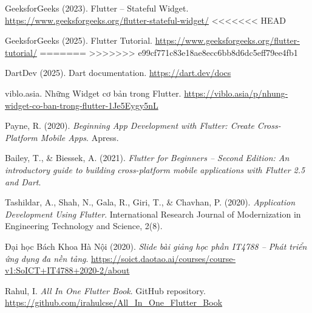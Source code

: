 \hypersetup{
  colorlinks=true,
  urlcolor=blue,
  linkcolor=black,
  citecolor=black
}

\begin{enumerate}[leftmargin=*, label={[\arabic*]}]
  \item GeeksforGeeks (2023). Flutter – Stateful Widget. \url{https://www.geeksforgeeks.org/flutter-stateful-widget/}
<<<<<<< HEAD
  \item GeeksforGeeks (2025). Flutter Tutorial. \url{https://www.geeksforgeeks.org/flutter-tutorial/}
=======
>>>>>>> e99cf771c83e18ae8ecc6bb8d6dc5eff79ee4fb1
  \item DartDev (2025). Dart documentation. \url{https://dart.dev/docs}
  \item viblo.asia. Những Widget cơ bản trong Flutter. \url{https://viblo.asia/p/nhung-widget-co-ban-trong-flutter-1Je5Eygy5nL}
  \item Payne, R. (2020). \textit{Beginning App Development with Flutter: Create Cross-Platform Mobile Apps}. Apress.
  \item Bailey, T., \& Biessek, A. (2021). \textit{Flutter for Beginners – Second Edition: An introductory guide to building cross-platform mobile applications with Flutter 2.5 and Dart}.
  \item Tashildar, A., Shah, N., Gala, R., Giri, T., \& Chavhan, P. (2020). \textit{Application Development Using Flutter}. International Research Journal of Modernization in Engineering Technology and Science, 2(8). 
  \item Đại học Bách Khoa Hà Nội (2020). \textit{Slide bài giảng học phần IT4788 – Phát triển ứng dụng đa nền tảng}. \url{https://soict.daotao.ai/courses/course-v1:SoICT+IT4788+2020-2/about} 
  \item Rahul, I. \textit{All In One Flutter Book}. GitHub repository. \url{https://github.com/irahulcse/All_In_One_Flutter_Book}
\end{enumerate}

